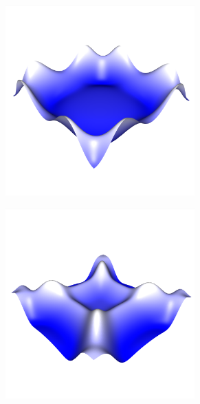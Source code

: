 \documentclass[crop=false]{standalone}
\begin{document}
\begin{figure}[h]
      \begin{subfigure}[b]{0.32\textwidth}
        \center
        \includegraphics[trim={0 0 0 2.2cm}, clip, width=0.8\textwidth]{images/intro_04.png}
        \caption{}
      \end{subfigure}
      \begin{subfigure}[b]{0.32\textwidth}
        \center
        \includegraphics[trim={0 0 0 2.2cm}, clip, width=0.8\textwidth]{images/intro_05.png}
        \caption{}
      \end{subfigure}
      \begin{subfigure}[b]{0.32\textwidth}

\end{subfigure}
\end{figure}
\end{document}
